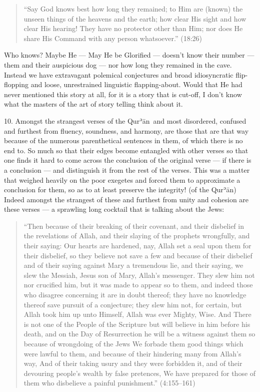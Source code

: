 \documentclass[12pt]{memoir}
\def\´{ʾ} %
\def \Quran{Qur\-\´ān} %
\def\–{-\hskip0pt}
\newcommand{\QRef}[1]{{\color{darkblue}#1}}
\begin{document}
\begin{quote}
“Say God knows best how long they remained;
to Him are (known) the unseen things of the heavens and the earth;
how clear His sight and how clear His hearing!
They have no protector other than Him;
nor does He share His Command with any person whatsoever.”
(\QRef{18:26})
\end{quote}

Who knows? Maybe He — May He be Glorified — doesn’t know their number —
them and their auspicious dog — nor how long they remained in the cave.
Instead we have extravagant polemical conjectures
and broad idiosyncratic flip\–flopping and loose,
unrestrained linguistic flapping\–about.
Would that He had never mentioned this story at all,
for it is a story that is cut-off,
I don’t know what the masters of the art of story telling
think about it.

10. Amongst the strangest verses of the \Quran\ and most disordered,
confused and furthest from fluency, soundness, and harmony,
are those that are that way because of the numerous
parenthetical sentences in them, of which there is no end to.
So much so that their edges become entangled with other verses so that
one finds it hard to come across the conclusion of the original verse —
if there is a conclusion — and distinguish it from the rest of the verses.
This was a matter that weighed heavily on the poor exegetes
and forced them to approximate a conclusion for them,
so as to at least preserve the integrity! (of the \Quran)
Indeed amongst the strangest of these and furthest from unity
and cohesion are these verses —
a sprawling long cocktail that is talking about the Jews:

\begin{quote}
“Then because of their breaking of their covenant,
and their disbelief in the revelations of Allah,
and their slaying of the prophets wrongfully, and their saying:
Our hearts are hardened, nay, Allah set a seal upon them for their disbelief,
so they believe not save a few and because of their disbelief
and of their saying against Mary a tremendous lie,
and their saying, we slew the Messiah, Jesus son of Mary, Allah’s messenger.
They slew him not nor crucified him, but it was made to appear so to them,
and indeed those who disagree concerning it are in doubt thereof;
they have no knowledge thereof save pursuit of a conjecture;
they slew him not, for certain, but Allah took him up unto Himself,
Allah was ever Mighty, Wise.
And There is not one of the People of the Scripture
but will believe in him before his death,
and on the Day of Resurrection he will be a witness against them
so because of wrongdoing of the Jews We forbade them good things
which were lawful to them,
and because of their hindering many from Allah’s way,
And of their taking usury and they were forbidden it,
and of their devouring people’s wealth by false pretences,
We have prepared for those of them who disbelieve a painful punishment.”
(\QRef{4:155–161})
\end{quote}
\end{document}
